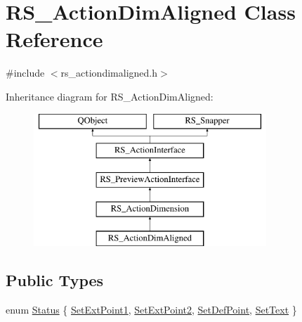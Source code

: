 \hypertarget{classRS__ActionDimAligned}{\section{R\-S\-\_\-\-Action\-Dim\-Aligned Class Reference}
\label{classRS__ActionDimAligned}
}


{\ttfamily \#include $<$rs\-\_\-actiondimaligned.\-h$>$}

Inheritance diagram for R\-S\-\_\-\-Action\-Dim\-Aligned\-:\begin{figure}[H]
\begin{center}
\leavevmode
\includegraphics[height=5.000000cm]{classRS__ActionDimAligned}
\end{center}
\end{figure}
\subsection*{Public Types}
\begin{DoxyCompactItemize}
\item 
enum \hyperlink{classRS__ActionDimAligned_a5583690cd24c860178d14fdd19d66529}{Status} \{ \hyperlink{classRS__ActionDimAligned_a5583690cd24c860178d14fdd19d66529a355bcf7dd541339518e59eab873a9bfd}{Set\-Ext\-Point1}, 
\hyperlink{classRS__ActionDimAligned_a5583690cd24c860178d14fdd19d66529a8e8877a19b091fd6e71f3747c1d1d0be}{Set\-Ext\-Point2}, 
\hyperlink{classRS__ActionDimAligned_a5583690cd24c860178d14fdd19d66529aea23beb8898967af127df48a06d016b3}{Set\-Def\-Point}, 
\hyperlink{classRS__ActionDimAligned_a5583690cd24c860178d14fdd19d66529a57435650e31cbf11abb436e4af44e8c4}{Set\-Text}
 \}
\end{DoxyCompactItemize}

